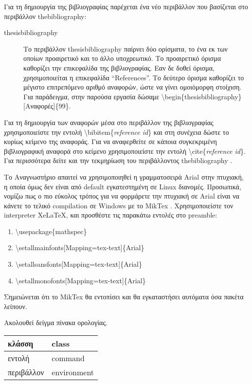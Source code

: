 \documentclass[english]{dithesis} %
\begin{document}
Για τη δημιουργία της βιβλιογραφίας παρέχεται ένα νέο περιβάλλον που
βασίζεται στο περιβάλλον thebibliography:
\begin{description}
\item[thesisbibliography]
  Το περιβάλλον thesisbibliography παίρνει δύο ορίσματα, το ένα εκ των οποίων
  προαιρετικό και το άλλο υποχρεωτικό.
  Το προαιρετικό όρισμα καθορίζει την επικεφαλίδα της βιβλιογραφίας.
  Εαν δε δοθεί όρισμα, χρησιμοποιείται η επικεφαλίδα ``References''.
  Το δεύτερο όρισμα καθορίζει το μέγιστο επιτρεπόμενο αριθμό αναφορών, ώστε
  να γίνει ομοιόμορφη στοίχιση.
  Για παράδειγμα, στην παρούσα εργασία δώσαμε
  \textbackslash{begin}\{thesisbibliography\}{[Αναφορές]}\{99\}.
\end{description}

Για τη δημιουργία των αναφορών μέσα στο περιβάλλον της βιβλιογραφίας
χρησιμοποιείστε την εντολή \textbackslash{bibitem}\{\textit{reference id}\} και
στη συνέχεια δώστε το κυρίως κείμενο της αναφοράς.
Για να αναφερθείτε σε κάποια συγκεκριμένη βιβλιογραφική αναφορά στο κείμενο
χρησιμοποιείστε την εντολή \textbackslash{cite}\{\textit{reference id}\}.
Για περισσότερα δείτε και την τεκμηρίωση του περιβάλλοντος thebibliography
\cite{Bibliography}.

Το Αναγνωστήριο απαιτεί να χρησιμοποιηθεί η γραμματοσειρά Arial στην πτυχιακή,
η οποία όμως δεν είναι από default εγκατεστημένη σε Linux διανομές.
Προσωπικά, νομίζω πως ο πιο εύκολος τρόπος για να φορμάρετε την πτυχιακή σε
Arial είναι να κάνετε το τελικό compilation σε Windows με το MikTex
\cite{Miktex}.
Χρησιμοποιείστε τον interpreter XeLaTeX, και προσθέστε τις παρακάτω
εντολές στο preamble:
\begin{enumerate}
\item
  \textbackslash{usepackage}\{mathspec\}
\item
  \textbackslash{setallmainfonts}{[Mapping=tex-text]}\{Arial\}
\item
  \textbackslash{setallsansfonts}{[Mapping=tex-text]}\{Arial\}
\item
  \textbackslash{setallmonofonts}{[Mapping=tex-text]}\{Arial\}
\end{enumerate}

Σημειώνεται ότι το MikTex θα εντοπίσει και θα εγκαταστήσει αυτόματα όσα πακέτα
λείπουν.

\begin{thesisterminology}
Ακολουθεί δείγμα πίνακα ορολογίας.

\begin{tabularx}{\textwidth}{|X|X|}
  \hline
  κλάσση     & class \\
  \hline
  εντολή     & command \\
  \hline
  περιβάλλον & environment \\
  \hline
\end{tabularx}

\end{thesisterminology}
\end{document}

